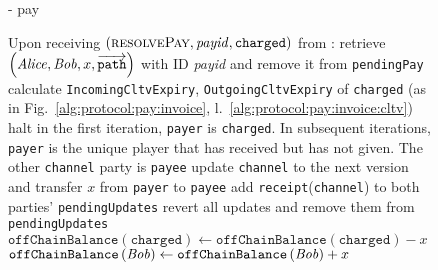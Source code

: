 \begin{figure}[H]
\begin{systembox}{\fpaynet - pay}
\begin{algorithmic}[1]
        \State Upon receiving $\left(\textsc{resolvePay}, \mathit{payid},
        \mathtt{charged}\right)$ from \simulator:
        \Indent
          \State retrieve $\left(\mathit{Alice}, \mathit{Bob}, x,
          \overrightarrow{\mathtt{path}}\right)$ with ID \textit{payid} and
          remove it from \texttt{pendingPay}
          \State calculate \texttt{IncomingCltvExpiry},
          \texttt{OutgoingCltvExpiry} of \texttt{charged} (as in
          Fig.~\ref{alg:protocol:pay:invoice},
          l.~\ref{alg:protocol:pay:invoice:cltv})
            \State \Return
            \State halt
          \EndIf
            \State in the first iteration, \texttt{payer} is \texttt{charged}. In
            subsequent iterations, \texttt{payer} is the unique player that has
            received but has not given. The other \texttt{channel} party is
            \texttt{payee}
              \State update \texttt{channel} to the next version and transfer
              $x$ from \texttt{payer} to \texttt{payee}
              \State add \texttt{receipt}(\texttt{channel}) to both parties'
              \texttt{pendingUpdates}
            \Else
              \State revert all updates and remove them from
              \texttt{pendingUpdates}
            \EndIf
          \EndFor
            \State $\mathtt{offChainBalance}\left(\mathtt{charged}\right) \gets
            \mathtt{offChainBalance}\left(\mathtt{charged}\right) - x$
          \EndIf
          \State $\mathtt{offChainBalance}\left(\mathit{Bob}\right) \gets
          \mathtt{offChainBalance}\left(\mathit{Bob}\right) + x$
        \EndIndent
      \end{algorithmic}
    \end{systembox}
    \caption{}
    \label{alg:fpaynet:pay}
  \end{figure}

